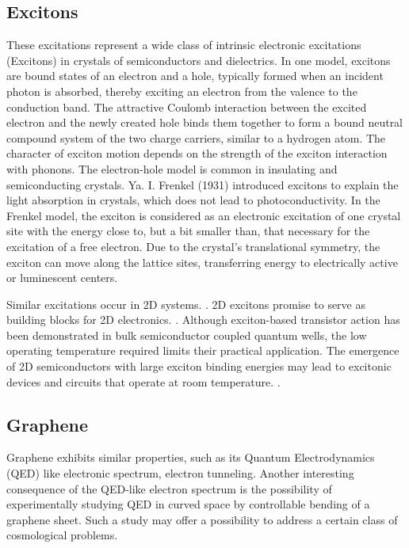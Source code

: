 \subsection{Excitons}
These excitations represent a wide class of intrinsic electronic excitations (Excitons) \cite{Excitons1, Excitons2} in crystals of semiconductors and dielectrics. In one model, excitons are bound states of an electron and a hole, typically formed when an incident photon is absorbed, thereby exciting an electron from the valence to the conduction band. The attractive Coulomb interaction between the excited electron and the newly created hole binds them together to form a bound neutral compound system of the two charge carriers, similar to a hydrogen atom. 
The character of exciton motion depends on the strength of the exciton interaction with phonons. The electron-hole model is common in insulating and semiconducting crystals.
Ya. I. Frenkel (1931) introduced excitons to explain the light absorption in crystals, which does not lead to photoconductivity. In the Frenkel model, the exciton is considered as an electronic excitation of one crystal site with the energy close to, but a bit smaller than, that necessary for the excitation of a free electron. Due to the crystal's translational symmetry, the exciton can move along the lattice sites, transferring energy to electrically active or luminescent centers.

Similar excitations occur in 2D systems. \cite{Excitons2D1,Excitons2D3}. 2D excitons promise to serve as building blocks for 2D electronics. \cite{Excitons2D2}.  Although exciton-based transistor action has been demonstrated in bulk semiconductor coupled quantum wells, the low operating temperature required limits their practical application. The emergence of 2D semiconductors with large exciton binding energies may lead to excitonic devices and circuits that operate at room temperature. \cite{Excitons2D2}.

\subsection{Graphene}
Graphene exhibits similar properties\cite{Graphene0}, such as its Quantum Electrodynamics (QED) like electronic spectrum, electron tunneling. Another interesting consequence of the QED-like electron spectrum is the possibility of experimentally studying QED in curved space by controllable bending of a graphene sheet. Such a study may offer a possibility to address a certain class of cosmological problems. 

